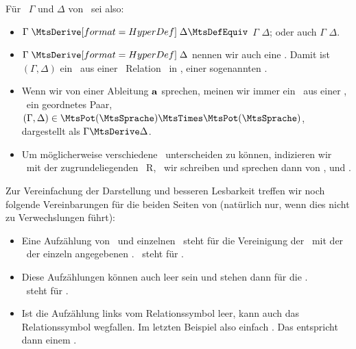 Für \Teilmengen\ $\Gamma$ und $\Delta$ von \MtsSprache\ sei also:
\begin{itemize}
	\item $\Gamma \defSymBin{\MtsDerive} \Delta \MtsDefEquiv$ $\Gamma$  $\Delta$; oder auch $\Gamma$  $\Delta$.
	\item $\Gamma \defSymBin{\MtsDerive} \Delta$ nennen wir auch eine   \MtsSprache.
	Damit ist $(\Gamma,\Delta)$ ein \Element\ aus einer \binaeren\ Relation \MtsDerive\ in \MtsPotSprache, einer sogenannten .
	\item Wenn wir von einer Ableitung $\mathbf{a}$ sprechen, meinen wir immer ein \Element\ aus einer \Ableitungsrelation, \textdh\ ein geordnetes Paar, \textzB\ $(\Gamma, \Delta) \in \MtsPotSprache \MtsTimes \MtsPotSprache$, dargestellt als $\Gamma \MtsDerive \Delta$.
	\item Um möglicherweise verschiedene \Ableitungsrelationen\ unterscheiden zu können, indizieren wir  \textggf\ mit der zugrundeliegenden \Relation\ R, \textdh\ wir schreiben  und sprechen dann von ,  und .
\end{itemize}
%
Zur Vereinfachung der Darstellung und besseren Lesbarkeit treffen wir noch folgende Vereinbarungen für die beiden Seiten von \seqqt{$\Gamma \MtsDerive \Delta$} (natürlich nur, wenn dies nicht zu Verwechslungen führt):
\begin{itemize}
	\item Eine Aufzählung von \Formelmengen\ und einzelnen \Formeln\ steht für die Vereinigung der \Formelmengen\ mit der \Menge\ der einzeln angegebenen \Formeln.
	\textZB\ steht \seqqt{$\Gamma, \alpha \MtsDerive \beta$} für \seqqt{$(\Gamma \MtsCup \{\alpha\}) \MtsDerive \{\beta\}$}.
	\item Diese Aufzählungen können auch leer sein und stehen dann für die \leereMenge.
	\\\textZB\ steht \seqqt{$\MtsDerive\; \alpha \OjkImp (\beta \OjkImp \alpha)$} für \seqqt{$\MtsEmptyset \MtsDerive \{\alpha \OjkImp (\beta \OjkImp \alpha)\}$}.
	\item Ist die Aufzählung links vom Relationssymbol \chrqt{\MtsDerive} leer, kann auch das Relationssymbol wegfallen.
	Im letzten Beispiel also einfach \seqqt{$\{\alpha \OjkImp (\beta \OjkImp \alpha)\}$}.
	Das entspricht dann einem .
\end{itemize}

